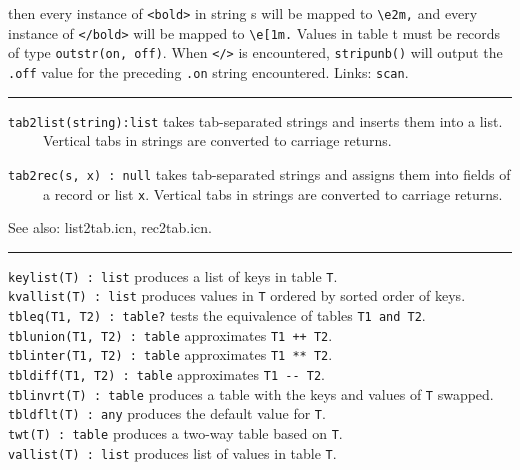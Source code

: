 \noindent then every instance of
\texttt{{\textquotedbl}{\textless}bold{\textgreater}{\textquotedbl}} in
string s will be mapped to
\texttt{{\textquotedbl}{\textbackslash}e2m,{\textquotedbl}} and every
instance of
\texttt{{\textquotedbl}{\textless}/bold{\textgreater}{\textquotedbl}}
will be mapped to
\texttt{{\textquotedbl}{\textbackslash}e[1m.{\textquotedbl}} Values in
table t must be records of type \texttt{outstr(on, off)}. When
\texttt{{\textquotedbl}{\textless}/{\textgreater}{\textquotedbl}} is
encountered, \texttt{stripunb()} will output the \texttt{.off} value
for the preceding \texttt{.on} string encountered.
Links: \texttt{scan}.

\vspace{0.25cm}\hrule{}

\texttt{tab2list(string):list} takes tab-separated strings and inserts
them into a list.\\
 \ \ \ \ \ Vertical tabs in strings are converted to carriage returns.

\texttt{tab2rec(s, x) : null} takes tab-separated strings and assigns
them into fields of\\
 \ \ \ \ \ a record or list \texttt{x}. Vertical tabs in strings are
converted to carriage returns.

See also: list2tab.icn, rec2tab.icn. 

\vspace{0.25cm}\hrule{}

\texttt{keylist(T) : list} produces a list of keys in table
\texttt{T}.\\
\texttt{kvallist(T) : list} produces values in \texttt{T} ordered by
sorted order of keys.\\
\texttt{tbleq(T1, T2) : table?} tests the equivalence of tables
\texttt{T1 and T2}.\\
\texttt{tblunion(T1, T2) : table} approximates \texttt{T1 ++
T2}.\\
\texttt{tblinter(T1, T2) : table} approximates \texttt{T1 **
T2}.\\
\texttt{tbldiff(T1, T2) : table} approximates \texttt{T1 -{}-
T2}.\\
\texttt{tblinvrt(T) : table} produces a table with the keys and values
of \texttt{T} swapped.\\
\texttt{tbldflt(T) : any} produces the default value for
\texttt{T}.\\
\texttt{twt(T) : table} produces a two-way table
based on \texttt{T}.\\
\texttt{vallist(T) : list} produces list of values in table \texttt{T}.

